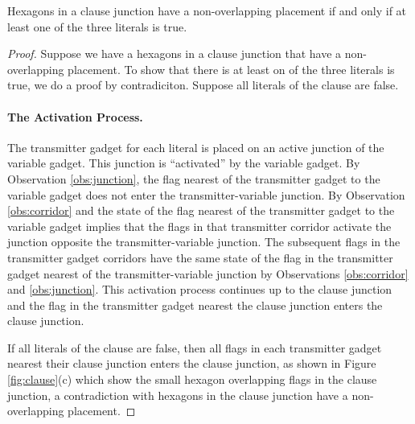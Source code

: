 \begin{lem}\label{lem:aux-1}
Hexagons in a clause junction have a non-overlapping placement if and only if at least one of the three literals is true.
\end{lem}
\begin{proof}
Suppose we have a hexagons in a clause junction that have a non-overlapping placement.
To show that there is at least on of the three literals is true,  we do a proof by contradiciton.
Suppose all literals of the clause are false.

\paragraph{The Activation Process.} 
The transmitter gadget for each literal is placed on an active junction of the variable gadget. 
This junction is ``activated'' by the variable gadget.  
By Observation \ref{obs:junction}, the flag nearest of the transmitter gadget to the variable gadget does not enter the transmitter-variable junction.
By Observation \ref{obs:corridor} and the state of the flag nearest of the transmitter gadget to the variable gadget implies that the flags in that transmitter corridor activate the junction opposite the transmitter-variable junction.
The subsequent flags in the transmitter gadget corridors have the same state of the flag in the transmitter gadget nearest of the transmitter-variable junction by Observations \ref{obs:corridor} and \ref{obs:junction}.
This activation process continues up to the clause junction and the flag in the transmitter gadget nearest the clause junction enters the clause junction.

If all literals of the clause are false, then all flags in each transmitter gadget nearest their clause junction enters the clause junction, as shown in Figure \ref{fig:clause}(c) which show the small hexagon overlapping flags in the clause junction, a contradiction with hexagons in the clause junction have a non-overlapping placement.
\end{proof}

